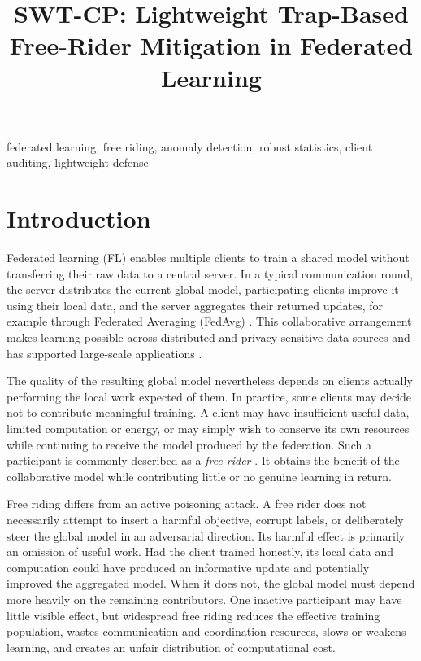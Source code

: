 \documentclass[conference]{IEEEtran}
\title{SWT-CP: Lightweight Trap-Based Free-Rider Mitigation in Federated Learning}
\author{\IEEEauthorblockN{Aashnan Rahman}
\IEEEauthorblockA{Department of Computer Science and Engineering\\
Islamic University of Technology\\Student ID: 231041006}}
\begin{document}
\maketitle

\begin{abstract}
\end{abstract}

\begin{IEEEkeywords}
federated learning, free riding, anomaly detection, robust statistics, client auditing, lightweight defense
\end{IEEEkeywords}

\section{Introduction}
Federated learning (FL) enables multiple clients to train a shared model without transferring their raw data to a central server. In a typical communication round, the server distributes the current global model, participating clients improve it using their local data, and the server aggregates their returned updates, for example through Federated Averaging (FedAvg) \cite{mcmahan2017communication}. This collaborative arrangement makes learning possible across distributed and privacy-sensitive data sources and has supported large-scale applications \cite{bonawitz2019towards,hard2018federated}.

The quality of the resulting global model nevertheless depends on clients actually performing the local work expected of them. In practice, some clients may decide not to contribute meaningful training. A client may have insufficient useful data, limited computation or energy, or may simply wish to conserve its own resources while continuing to receive the model produced by the federation. Such a participant is commonly described as a \emph{free rider} \cite{lin2019freeriders,fraboni2021freerider}. It obtains the benefit of the collaborative model while contributing little or no genuine learning in return.

Free riding differs from an active poisoning attack. A free rider does not necessarily attempt to insert a harmful objective, corrupt labels, or deliberately steer the global model in an adversarial direction. Its harmful effect is primarily an omission of useful work. Had the client trained honestly, its local data and computation could have produced an informative update and potentially improved the aggregated model. When it does not, the global model must depend more heavily on the remaining contributors. One inactive participant may have little visible effect, but widespread free riding reduces the effective training population, wastes communication and coordination resources, slows or weakens learning, and creates an unfair distribution of computational cost.
\end{document}
